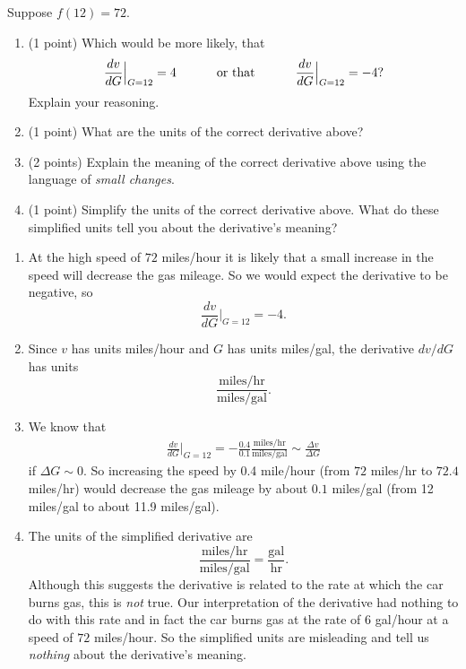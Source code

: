 \documentclass{ximera}
\begin{document}
\begin{enumerate}
Suppose $f(12)=72$. 


\begin{enumerate}

\item (1 point) Which would be more likely, that
\[
   \frac{dv}{dG}\Big|_{G=12} = 4 \hskip 0.4 in \text{ or that } \hskip 0.4 in  \frac{dv}{dG}\Big|_{G=12} = -4?
\]
Explain your reasoning.




\item (1 point) What are the units of the correct derivative above?



\item (2 points) Explain the meaning of the correct derivative above using the language of \emph{small changes}.



\item (1 point) Simplify the units of the correct derivative above. What do these simplified units tell you about the derivative's meaning?
\end{enumerate}

\begin{explanation}
\begin{enumerate}
\item At the high speed of $72$ miles/hour it is likely that a small increase in the speed will decrease the gas mileage. So we would expect the derivative to be negative, so
\[
  \frac{dv}{dG}\Big|_{G=12} = -4 .
\]

\item Since $v$ has units miles/hour and $G$ has units miles/gal, the derivative $dv/dG$ has units
\[
   \frac{\text{miles/hr}}{\text{miles/gal}} .
\]

\item We know that
\begin{align*}
      \frac{dv}{dG}\Big|_{G=12} = -\frac{0.4}{0.1} \frac{\text{miles/hr}}{\text{miles/gal}} \sim \frac{\Delta v}{\Delta G}
\end{align*}
if $\Delta G \sim 0$. So increasing the speed by  0.4 mile/hour (from $72$ miles/hr to $72.4$ miles/hr) would decrease the gas mileage by about $0.1$ miles/gal (from 12 miles/gal to about 11.9 miles/gal).

\item The units of the simplified derivative are
\[
   \frac{\text{miles/hr}}{\text{miles/gal}}  = \frac{\text{gal}}{\text{hr}}.
\]
Although this suggests the derivative is related to the rate at which the car burns gas, this is \emph{not} true. Our interpretation of the derivative had nothing to do with this rate and in fact the car burns gas at the rate of $6$ gal/hour at a speed of $72$ miles/hour. So the simplified units are misleading and tell us \emph{nothing} about the derivative's meaning. 


\end{enumerate}
\end{explanation}
\end{enumerate}
\end{document}
